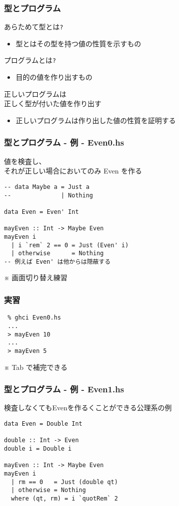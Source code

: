 \documentclass[cjk,dvipdfm,14pt]{beamer}
\begin{document}
\begin{frame}[fragile]
\frametitle{型とプログラム}

あらためて型とは\verb|?|
\begin{itemize}
\item 型とはその型を持つ値の性質を示すもの
\end{itemize}

プログラムとは\verb|?|
\begin{itemize}
\item 目的の値を作り出すもの
\end{itemize}

正しいプログラムは\\正しく型が付いた値を作り出す
\begin{itemize}
\item { \color{red} 正しいプログラムは作り出した値の性質を証明する }
\end{itemize}

\end{frame}

\begin{frame}[fragile]
\frametitle{型とプログラム - 例 - Even0.hs}

値を検査し、\\
それが正しい場合においてのみ Even を作る
\begin{lstlisting}
-- data Maybe a = Just a
--              | Nothing

data Even = Even' Int

mayEven :: Int -> Maybe Even
mayEven i
  | i `rem` 2 == 0 = Just (Even' i)
  | otherwise      = Nothing
-- 例えば Even' は他からは隠蔽する
\end{lstlisting}

\end{frame}

\begin{frame}[fragile]
※ 画面切り替え練習
\end{frame}

\begin{frame}[fragile]
\frametitle{実習}

\begin{lstlisting}
 % ghci Even0.hs
 ...
 > mayEven 10
 ...
 > mayEven 5
\end{lstlisting}
※ Tab で補完できる

\end{frame}

\begin{frame}[fragile]
\frametitle{型とプログラム - 例 - Even1.hs}

検査しなくてもEvenを作るくことができる公理系の例
\begin{lstlisting}
data Even = Double Int

double :: Int -> Even
double i = Double i

mayEven :: Int -> Maybe Even
mayEven i
  | rm == 0   = Just (double qt)
  | otherwise = Nothing
  where (qt, rm) = i `quotRem` 2
\end{lstlisting}

\end{frame}
\end{document}
